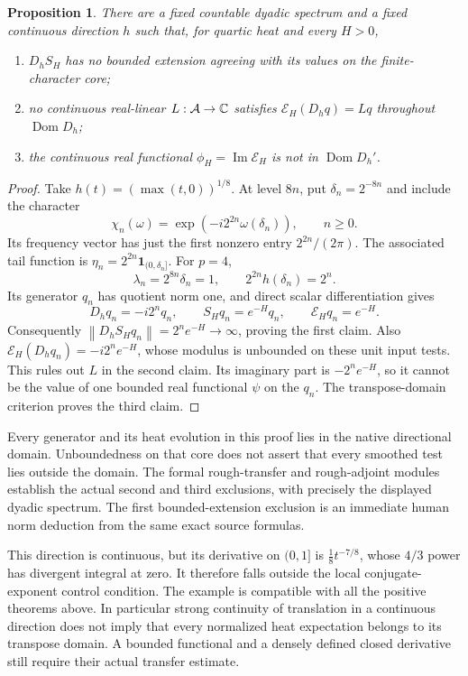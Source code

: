 \documentclass[11pt]{article}
\newtheorem{proposition}[theorem]{Proposition}
\theoremstyle{remark}\newtheorem{remark}[theorem]{Remark}
\newcommand{\A}{\mathcal A}\newcommand{\X}{\mathcal X}
\newcommand{\E}{\mathcal E}\newcommand{\norm}[1]{\left\lVert#1\right\rVert}
\begin{document}
\begin{proposition}\label{prop:rough}
There are a fixed countable dyadic spectrum and a fixed continuous
direction $h$ such that, for quartic heat and every $H>0$,
\begin{enumerate}
 \item $D_hS_H$ has no bounded extension agreeing with its values on
 the finite-character core;
 \item no continuous real-linear $L:\A\to\C$ satisfies
 $\E_H(D_hq)=Lq$ throughout $\operatorname{Dom}D_h$;
 \item the continuous real functional $\phi_H=\operatorname{Im}\E_H$
 is not in $\operatorname{Dom}D_h'$.
\end{enumerate}
\end{proposition}
\begin{proof}
Take $h(t)=(\max(t,0))^{1/8}$. At level $8n$, put
$\delta_n=2^{-8n}$ and include the character
\[
 \chi_n(\omega)=\exp(-i2^{2n}\omega(\delta_n)),\qquad n\ge0.
\]
Its frequency vector has just the first nonzero entry
$2^{2n}/(2\pi)$. The associated tail function is
$\eta_n=2^{2n}\mathbf1_{(0,\delta_n]}$. For $p=4$,
\[
 \lambda_n=2^{8n}\delta_n=1,\qquad
 2^{2n}h(\delta_n)=2^n.
\]
Its generator $q_n$ has quotient norm one, and direct scalar
differentiation gives
\[
 D_hq_n=-i2^nq_n,\qquad S_Hq_n=e^{-H}q_n,\qquad
 \E_Hq_n=e^{-H}.
\]
Consequently $\norm{D_hS_Hq_n}=2^ne^{-H}\to\infty$, proving the first
claim. Also $\E_H(D_hq_n)=-i2^ne^{-H}$, whose modulus is unbounded
on these unit input tests. This rules out $L$ in the second claim.
Its imaginary part is $-2^ne^{-H}$, so it cannot be the value of one
bounded real functional $\psi$ on the $q_n$. The transpose-domain
criterion proves the third claim.
\end{proof}

Every generator and its heat evolution in this proof lies in the
native directional domain. Unboundedness on that core does not
assert that every smoothed test lies outside the domain. The formal
rough-transfer and rough-adjoint modules establish the actual second
and third exclusions, with precisely the displayed dyadic spectrum.
The first bounded-extension exclusion is an immediate human norm
deduction from the same exact source formulas.

This direction is continuous, but its derivative on $(0,1]$ is
$\frac18t^{-7/8}$, whose $4/3$ power has divergent integral at zero.
It therefore falls outside the local conjugate-exponent control
condition. The example is compatible with all the positive theorems
above. In particular strong continuity of translation in a continuous
direction does not imply that every normalized heat expectation
belongs to its transpose domain. A bounded functional and a densely
defined closed derivative still require their actual transfer
estimate.
\end{document}
